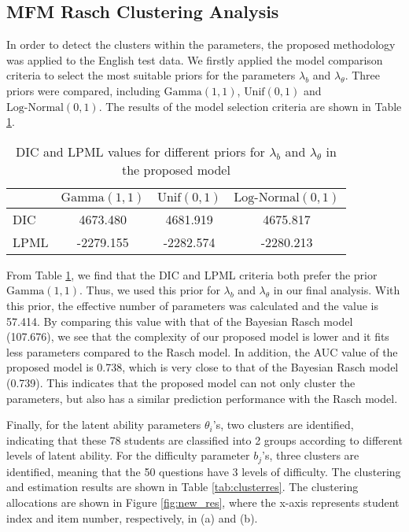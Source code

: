 \documentclass[12pt]{article}
\begin{document}
\subsection{MFM Rasch Clustering Analysis}
In order to detect the clusters within the parameters, the proposed methodology was applied to the English test data. 
 We firstly applied the model comparison criteria to select the most suitable priors for the parameters $\lambda_b$ and $\lambda_{\theta}$. Three priors were compared, including $\text{Gamma}(1,1)$, $\text{Unif}(0, 1)$ and $\text{Log-Normal}(0,1)$. The results of the model selection criteria are shown in Table \ref{tab:LPML}.


\begin{table}[h!]
	\centering
	\caption{DIC and LPML values for different priors
		for $\lambda_b$ and $\lambda_{\theta}$ in the proposed model}\label{tab:LPML}
	\begin{tabular}{lccc}
		\toprule
		& $\text{Gamma}(1,1)$ &$\text{Unif}(0, 1)$ & $\text{Log-Normal}(0,1)$  \\
		\midrule 
		DIC & 4673.480 & 4681.919 & 4675.817 \\
		LPML & -2279.155 & -2282.574 & -2280.213 \\ 
		\bottomrule
	\end{tabular}
\end{table} 



From Table \ref{tab:LPML}, we find that the DIC and LPML criteria both prefer the prior $\text{Gamma}(1, 1)$. Thus, we used this prior for $\lambda_b$ and $\lambda_{\theta}$ in our final analysis. 
With this prior, the effective number of parameters was calculated and the value is 57.414. By comparing this value with that of the Bayesian Rasch model (107.676), we see that the complexity of our proposed model is lower and it fits less parameters compared to the Rasch model. In addition, the AUC value of the proposed model is 0.738, which is very close to that of the Bayesian Rasch model (0.739). This indicates that the proposed model can not only cluster the parameters, but also has a similar prediction performance with the Rasch model.

Finally, for the latent ability parameters $\theta_i$'s, two clusters are identified, indicating that these 78 students are classified into 2 groups according to different levels of latent ability.  
For the difficulty parameter $b_j$'s, three clusters are identified, meaning that the 50 questions have 3 levels of difficulty. 
The clustering and estimation results are shown in Table \ref{tab:clusterres}. The clustering allocations are shown in Figure \ref{fig:new_res}, where the x-axis represents student index and item number, respectively, in (a) and (b).
\end{document}
